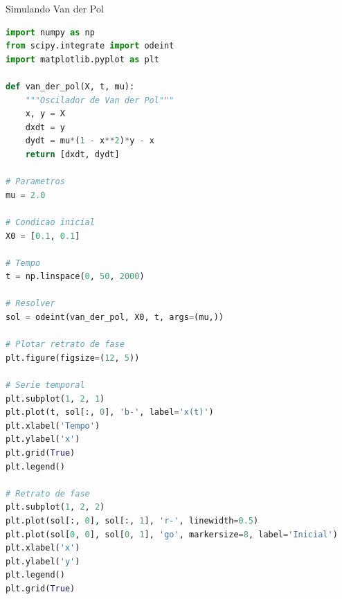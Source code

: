\begin{frame}{Simulando Van der Pol}
\begin{lstlisting}[language=Python, basicstyle=\ttfamily\footnotesize]
import numpy as np
from scipy.integrate import odeint
import matplotlib.pyplot as plt

def van_der_pol(X, t, mu):
    """Oscilador de Van der Pol"""
    x, y = X
    dxdt = y
    dydt = mu*(1 - x**2)*y - x
    return [dxdt, dydt]

# Parametros
mu = 2.0

# Condicao inicial
X0 = [0.1, 0.1]

# Tempo
t = np.linspace(0, 50, 2000)

# Resolver
sol = odeint(van_der_pol, X0, t, args=(mu,))

# Plotar retrato de fase
plt.figure(figsize=(12, 5))

# Serie temporal
plt.subplot(1, 2, 1)
plt.plot(t, sol[:, 0], 'b-', label='x(t)')
plt.xlabel('Tempo')
plt.ylabel('x')
plt.grid(True)
plt.legend()

# Retrato de fase
plt.subplot(1, 2, 2)
plt.plot(sol[:, 0], sol[:, 1], 'r-', linewidth=0.5)
plt.plot(sol[0, 0], sol[0, 1], 'go', markersize=8, label='Inicial')
plt.xlabel('x')
plt.ylabel('y')
plt.legend()
plt.grid(True)
\end{lstlisting}
\end{frame}


